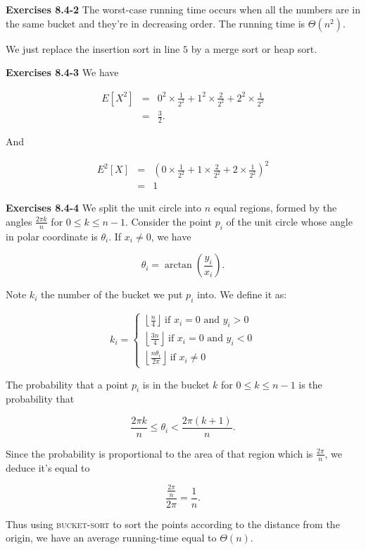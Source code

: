 \documentclass[a4paper,12pt]{article}
\newcommand{\newpar}[1]
{\bigskip \noindent \textbf{Exercises #1} \newline}
\begin{document}
\newpar{8.4-2} The worst-case running time occurs when all the numbers
are in the same bucket and they're in decreasing order.  The running
time is $\Theta(n^2)$.

We just replace the insertion sort in line $5$ by a merge sort or heap
sort.

\newpar{8.4-3} We have

\begin{eqnarray*}
  E[X^2] &=& 0^2 \times \frac{1}{2^2} + 1^2 \times \frac{2}{2^2} + 2^2
  \times \frac{1}{2^2} \\
  &=& \frac{3}{2}.
\end{eqnarray*}

And

\begin{eqnarray*}
  E^2[X] &=& \left(0 \times \frac{1}{2^2} + 1 \times \frac{2}{2^2} + 2
  \times \frac{1}{2^2}\right)^2 \\
  &=& 1
\end{eqnarray*}

\newpar{8.4-4} We split the unit circle into $n$ equal regions, formed
by the angles $\frac{2\pi k}{n}$ for $0 \le k\le n-1$.  Consider the
point $p_i$ of the unit circle whose angle in polar coordinate is
$\theta_i$.  If $x_i \not= 0$, we have

\[ \theta_i = \arctan\left(\frac{y_i}{x_i}\right).\]

Note $k_i$ the number of the bucket we put $p_i$ into.  We
define it as:

\[
k_i = \left\{
\begin{array}{l}
  \left\lfloor\frac{n}{4}\right\rfloor\ \mbox{if $x_i = 0$ and $y_i > 0$} \\
  \left\lfloor\frac{3n}{4}\right\rfloor\ \mbox{if $x_i = 0$ and $y_i < 0$} \\
  \left\lfloor \frac{n\theta_i}{2\pi}\right\rfloor\ \mbox{if $x_i \not= 0$}
\end{array}
\right.
\]

The probability that a point $p_i$ is in the bucket $k$ for $0\le k\le
n-1$ is the probability that

\[ \frac{2\pi k}{n} \le \theta_i < \frac{2\pi(k+1)}{n}.\]

Since the probability is proportional to the area of that region which
is $\frac{2\pi}{n}$, we deduce it's equal to

\[ \frac{\frac{2\pi}{n}}{2\pi} = \frac{1}{n}.\]

Thus using \textsc{bucket-sort} to sort the points according to the
distance from the origin, we have an average running-time equal to
$\Theta(n)$.
\end{document}
